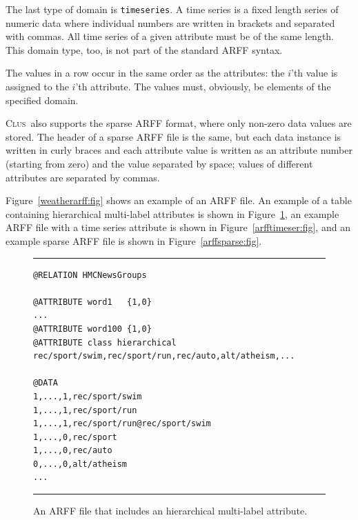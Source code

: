 \documentclass[a4paper]{report}
\newcommand{\clus}{\textsc{Clus}}
\begin{document}
The last type of domain is \texttt{timeseries}. A time series is a fixed length series of numeric data where individual numbers are written in brackets and separated with commas. All time series of a given attribute must be of the same length. This domain type, too, is not part of the standard ARFF syntax.

The values in a	 row occur in the same order as the attributes: the $i$'th value is assigned to the $i$'th attribute.  The values must, obviously, be elements of the specified domain.  

\clus\ also supports the sparse ARFF format, where only non-zero data values are stored. The header of a sparse ARFF file is the same, but each data instance is written in curly braces and each attribute value is written as an attribute number (starting from zero) and the value separated by space; values of different attributes are separated by commas.

Figure~\ref{weatherarff:fig} shows an example of an ARFF file. An example of a table containing hierarchical multi-label attributes is shown in Figure~\ref{arffhmc:fig}, an example ARFF file with a time series attribute is shown in Figure~\ref{arfftimeser:fig}, and an example sparse ARFF file is shown in Figure~\ref{arffsparse:fig}.

\begin{figure}[tb]
\hrule\vspace{1em}
\begin{verbatim}
@RELATION HMCNewsGroups

@ATTRIBUTE word1   {1,0}
...
@ATTRIBUTE word100 {1,0}
@ATTRIBUTE class hierarchical rec/sport/swim,rec/sport/run,rec/auto,alt/atheism,...

@DATA
1,...,1,rec/sport/swim
1,...,1,rec/sport/run
1,...,1,rec/sport/run@rec/sport/swim
1,...,0,rec/sport
1,...,0,rec/auto
0,...,0,alt/atheism
...
\end{verbatim}
\hrule\vspace{1em}
\caption{An ARFF file that includes an hierarchical multi-label attribute.}
\label{arffhmc:fig}
\end{figure}
\end{document}
